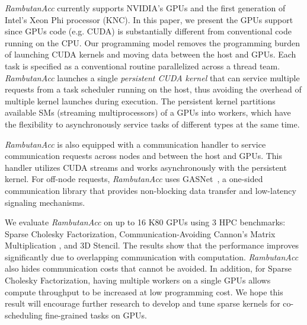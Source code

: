 {\em RambutanAcc} currently supports NVIDIA's GPUs and the first generation of Intel's Xeon Phi processor (KNC).
In this paper, we present the GPUs support since GPUs code (e.g. CUDA) is substantially different from conventional code running on the CPU.
Our programming model removes the programming burden of launching CUDA kernels and moving data between the host and GPUs.
Each task is specified as a conventional routine parallelized across a thread team.
{\em RambutanAcc} launches a single {\em persistent CUDA kernel} that can service multiple requests from a task scheduler running on the host, thus avoiding the overhead of multiple kernel launches during execution.
The persistent kernel partitions available SMs (streaming multiprocessors) of a GPUs into workers, which have the flexibility to asynchronously service tasks of different types at the same time.

{\em RambutanAcc} is also equipped with a communication handler to service communication requests across nodes and between the host and GPUs.
This handler utilizes CUDA streams and works asynchronously with the persistent kernel.
For off-node requests, {\em RambutanAcc} uses GASNet~\cite{Bonachea:2002:gasnet}, a one-sided communication library %
that provides non-blocking data transfer and low-latency signaling mechanisms. %

We evaluate {\em RambutanAcc} on up to 16 K80 GPUs using 3 HPC benchmarks: Sparse Cholesky Factorization, Communication-Avoiding Cannon's Matrix Multiplication \cite{25Dcannon}, and 3D Stencil.
The results show that the performance improves significantly due to overlapping communication with computation.
{\em RambutanAcc} also hides communication costs that cannot be avoided.
In addition, for Sparse Cholesky Factorization, having multiple workers on a single GPUs allows compute throughput to be increased at low programming cost. 
We hope this result will encourage further research to develop and tune sparse kernels for co-scheduling fine-grained tasks on GPUs.

